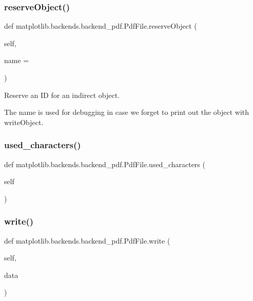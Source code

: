\subsubsection{\texorpdfstring{reserve\+Object()}{reserveObject()}}
{\footnotesize\ttfamily def matplotlib.\+backends.\+backend\+\_\+pdf.\+Pdf\+File.\+reserve\+Object (\begin{DoxyParamCaption}\item[{}]{self,  }\item[{}]{name = {\ttfamily \textquotesingle{}\textquotesingle{}} }\end{DoxyParamCaption})}

\begin{DoxyVerb}Reserve an ID for an indirect object.

The name is used for debugging in case we forget to print out
the object with writeObject.
\end{DoxyVerb}
 \mbox{\label{classmatplotlib_1_1backends_1_1backend__pdf_1_1PdfFile_ae4e34367a53e29309b254778f7c65a6f}} 
\subsubsection{\texorpdfstring{used\+\_\+characters()}{used\_characters()}}
{\footnotesize\ttfamily def matplotlib.\+backends.\+backend\+\_\+pdf.\+Pdf\+File.\+used\+\_\+characters (\begin{DoxyParamCaption}\item[{}]{self }\end{DoxyParamCaption})}

\mbox{\label{classmatplotlib_1_1backends_1_1backend__pdf_1_1PdfFile_a38d3f7d088f25278b08b924bb0834c38}} 
\subsubsection{\texorpdfstring{write()}{write()}}
{\footnotesize\ttfamily def matplotlib.\+backends.\+backend\+\_\+pdf.\+Pdf\+File.\+write (\begin{DoxyParamCaption}\item[{}]{self,  }\item[{}]{data }\end{DoxyParamCaption})}


